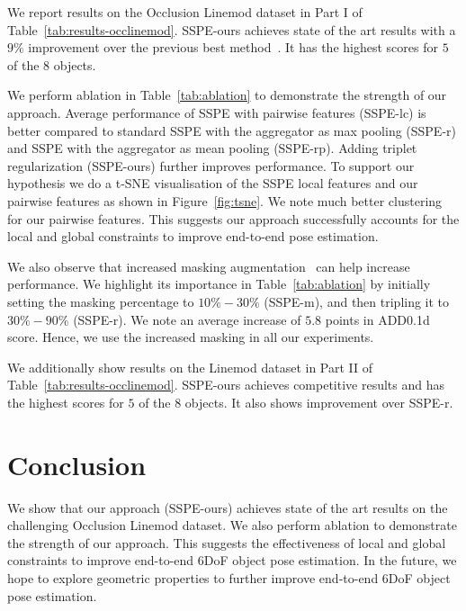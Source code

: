 \documentclass{article}
\begin{document}
We report results on the Occlusion Linemod dataset in Part I of Table~\ref{tab:results-occlinemod}. SSPE-ours achieves state of the art results with a $9\%$ improvement over the previous best method~\cite{proxyvoting}. It has the highest scores for $5$ of the $8$ objects. 

We perform ablation in Table~\ref{tab:ablation} to demonstrate the strength of our approach. Average performance of SSPE with pairwise features (SSPE-lc) is better compared to standard SSPE with the aggregator as max pooling (SSPE-r) and SSPE with the aggregator as mean pooling (SSPE-rp). Adding triplet regularization (SSPE-ours) further improves performance. To support our hypothesis we do a t-SNE visualisation of the SSPE local features and our pairwise features as shown in Figure~\ref{fig:tsne}. We note much better clustering for our pairwise features. This suggests our approach successfully accounts for the local and global constraints to improve end-to-end pose estimation.


We also observe that increased masking augmentation~\cite{zhong2020random} can help increase performance. We highlight its importance in Table~\ref{tab:ablation} by initially setting the masking percentage to $10\%-30\%$ (SSPE-m), and then tripling it to $30\%-90\%$ (SSPE-r). We note an average increase of $5.8$ points in ADD0.1d score. Hence, we use the increased masking in all our experiments.

We additionally show results on the Linemod dataset in Part II of Table~\ref{tab:results-occlinemod}. SSPE-ours achieves competitive results and has the highest scores for $5$ of the $8$ objects. It also shows improvement over SSPE-r.

\section{Conclusion}

We show that our approach (SSPE-ours) achieves state of the art results on the challenging Occlusion Linemod dataset. We also perform ablation to demonstrate the strength of our approach. This suggests the effectiveness of local and global constraints to improve end-to-end 6DoF object pose estimation. In the future, we hope to explore geometric properties to further improve end-to-end 6DoF object pose estimation.



\end{document}
